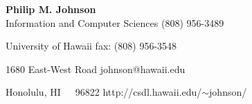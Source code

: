 



\newcommand{\newcategory}[1]{\newenvironment{#1}
 {\sectionheading{#1}\par\vspace*{0.03in}\par\hrule\par\begin{description}}{\end{description}\par}}
\newcommand{\sectionheading}[1]{\medskip\pagebreak[2]\par\noindent
 {\bf #1}\nopagebreak}

\newcategory{Degrees}
\newcategory{Tutorial Presentations}
\newcategory{Journal Publications}
\newcategory{Conference Publications}
\newcategory{Workshop Publications}
\newcategory{Publications}
\newcategory{Book Chapters}
\newcategory{Invited Talks}
\newcategory{Awarded Grant Support}
\newcategory{Pending Grant Support}
\newcategory{Professional Activities}
\newcategory{Research and Teaching Experience}
\newcategory{Industry Experience}
\newcategory{Awards and Honors}



\begin{center}
{\bf Philip M. Johnson}\\
Information and Computer Sciences \hfill (808) 956-3489

University of Hawaii              \hfill fax: (808) 956-3548

1680 East-West Road               \hfill johnson@hawaii.edu

Honolulu, HI~~~96822              \hfill http://csdl.hawaii.edu/$\sim$johnson/

\end{center}

